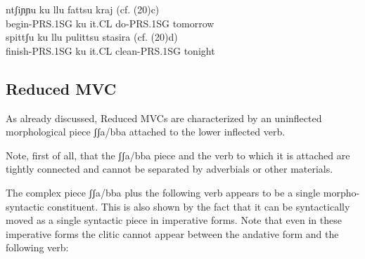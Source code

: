 \documentclass[output=paper]{langscibook}
\begin{document}
\ea \label{ac21}
    \ea \label{ac21a}\gll ntʃiɲɲu     ku  llu   fattsu     kraj  (cf. (20)c) \\
     begin-PRS.1SG  ku  it.CL do-PRS.1SG  tomorrow\\
    \ex \label{ac21b}\gll spittʃu      ku  llu   pulittsu     stasira (cf. (20)d) \\
     finish-PRS.1SG ku it.CL clean-PRS.1SG  tonight\\
    \z
\z


\subsection{Reduced MVC}

As already discussed, Reduced MVCs are characterized by an uninflected morphological piece ʃʃa/bba attached to the lower inflected verb.   

Note, first of all, that the ʃʃa/bba piece and the verb to which it is attached are tightly connected and cannot be separated by adverbials or other materials. 

\ea \label{ac22}
  \z
\z

The complex piece ʃʃa/bba plus the following verb appears to be a single morpho-syntactic constituent.  This is also shown by the fact that it can be syntactically moved as a single syntactic piece in imperative forms. Note that even in these imperative forms the clitic cannot appear between the andative form and the following verb:

\ea \label{ac23}
    \z
\z
\end{document}
